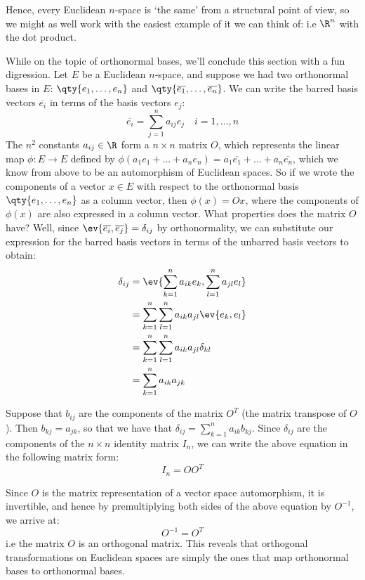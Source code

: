 Hence, every Euclidean \( n \)-space is `the same' from a structural point of view, so we might as well work with the easiest example of it we can think of: i.e \( \R^n \) with the dot product.

\vspace{3mm}

While on the topic of orthonormal bases, we'll conclude this section with a fun digression. Let \( E \) be a Euclidean \( n \)-space, and suppose we had two orthonormal bases in \( E \): \( \qty{e_1,\dots,e_n} \) and \( \qty{\overline{e_1},\dots,\overline{e_n}} \). We can write the barred basis vectors \( \overline{e_i} \) in terms of the basis vectors \( e_j \):
\[ \overline{e_i}=\sum_{j=1}^na_{ij}e_j \quad i=1,\dots,n \]
The \( n^2 \) constants \( a_{ij}\in\R \) form a \( n\times n \) matrix \( O \), which represents the linear map \( \phi:E\to E \) defined by \( \phi(a_1e_1+\dots+a_ne_n)=a_1\overline{e_1}+\dots+a_n\overline{e_n} \), which we know from above to be an automorphism of Euclidean spaces. So if we wrote the components of a vector \( x\in E \) with respect to the orthonormal basis \( \qty{e_1,\dots,e_n} \) as a column vector, then \( \phi(x)=Ox \), where the components of \( \phi(x) \) are also expressed in a column vector. What properties does the matrix \( O \) have? Well, since \( \ev{\overline{e_i},\overline{e_j}}=\delta_{ij} \) by orthonormality, we can substitute our expression for the barred basis vectors in terms of the unbarred basis vectors to obtain:
\begin{align*}
  \delta_{ij}&= \ev{\sum_{k=1}^na_{ik}e_k,\sum_{l=1}^na_{jl}e_l}\\
  &= \sum_{k=1}^n\sum_{l=1}^na_{ik}a_{jl}\ev{e_k,e_l}\\
  &= \sum_{k=1}^n\sum_{l=1}^na_{ik}a_{jl}\delta_{kl}\\
  &= \sum_{k=1}^na_{ik}a_{jk}
\end{align*}

Suppose that \( b_{ij} \) are the components of the matrix \( O^T \) (the matrix transpose of \( O \)). Then \( b_{kj}=a_{jk} \), so that we have that \( \delta_{ij}=\sum_{k=1}^n a_{ik}b_{kj} \). Since \( \delta_{ij} \) are the components of the \( n\times n \) identity matrix \( I_n \), we can write the above equation in the following matrix form:
\[ I_n=OO^T \]

Since \( O \) is the matrix representation of a vector space automorphism, it is invertible, and hence by premultiplying both sides of the above equation by \( O^{-1} \), we arrive at:
\[ O^{-1}=O^T \]
i.e the matrix \( O \) is an orthogonal matrix. This reveals that orthogonal transformations on Euclidean spaces are simply the ones that map orthonormal bases to orthonormal bases.

